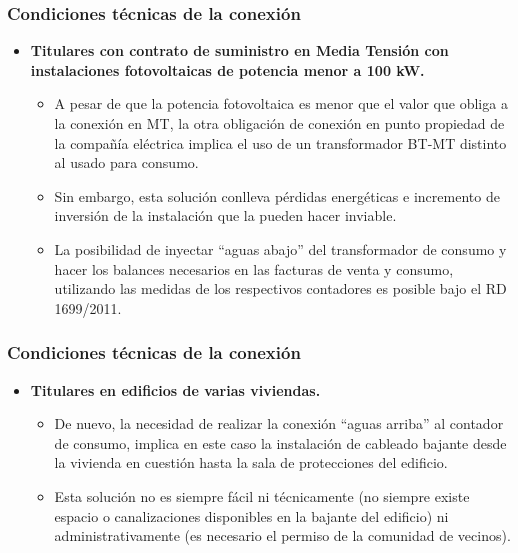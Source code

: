 \documentclass[serif, xcolor=dvipsnames]{beamer}
\begin{document}
\begin{frame}
  \frametitle{Condiciones técnicas de la conexión}
  \begin{itemize}
  \item \textbf{Titulares con contrato de suministro en Media Tensión
      con instalaciones fotovoltaicas de potencia menor a 100 kW. }

    \begin{itemize}
    \item A pesar de que la potencia fotovoltaica es menor que el
      valor que obliga a la conexión en MT, la otra obligación de
      conexión en punto propiedad de la compañía eléctrica implica el
      uso de un transformador BT-MT distinto al usado para consumo.
    \item Sin embargo, esta solución conlleva pérdidas energéticas e
      incremento de inversión de la instalación que la pueden hacer
      inviable.
    \item La posibilidad de inyectar \textquotedblleft{}aguas
      abajo\textquotedblright{} del transformador de consumo y hacer
      los balances necesarios en las facturas de venta y consumo,
      utilizando las medidas de los respectivos contadores es posible
      bajo el RD 1699/2011.

    \end{itemize}
  \end{itemize}

\end{frame}

\begin{frame}
  \frametitle{Condiciones técnicas de la conexión}
  \begin{itemize}
  \item \textbf{Titulares en edificios de varias viviendas. }

    \begin{itemize}
    \item De nuevo, la necesidad de realizar la conexión
      \textquotedblleft{}aguas arriba\textquotedblright{} al contador
      de consumo, implica en este caso la instalación de cableado
      bajante desde la vivienda en cuestión hasta la sala de
      protecciones del edificio.
    \item Esta solución no es siempre fácil ni técnicamente (no
      siempre existe espacio o canalizaciones disponibles en la
      bajante del edificio) ni administrativamente (es necesario el
      permiso de la comunidad de vecinos).
    \end{itemize}
  \end{itemize}

\end{frame}
\end{document}
